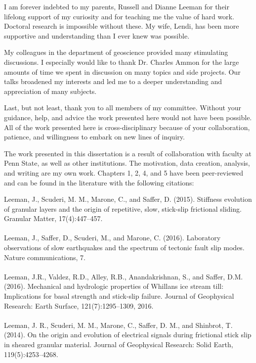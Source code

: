 \documentclass[11pt]{psuthesis}
\begin{document}
\begin{frontmatter}
\acknowledgments  

I am forever indebted to my parents, Russell and Dianne Leeman for their lifelong support of my curiosity and for teaching me the value of hard work. Doctoral research is impossible without these. My wife, Lendi, has been more supportive and understanding than I ever knew was possible. 

My colleagues in the department of geoscience provided many stimulating discussions. I especially would like to thank Dr. Charles Ammon for the large amounts of time we spent in discussion on many topics and side projects. Our talks broadened my interests and led me to a deeper understanding and appreciation of many subjects.

Last, but not least, thank you to all members of my committee. Without your guidance, help, and advice the work presented here would not have been possible. All of the work presented here is cross-disciplinary because of your collaboration, patience, and willingness to embark on new lines of inquiry.

\preface 
\begin{singlespace}
\noindent
The work presented in this dissertation is a result of collaboration with faculty at Penn State, as well as other institutions. The motivation, data creation, analysis, and writing are my own work. Chapters 1, 2, 4, and 5 have been peer-reviewed and can be found in the literature with the following citations: \\
\begin{adjustwidth}{2cm}{}
Leeman, J., Scuderi, M. M., Marone, C., and Saffer, D. (2015). Stiffness evolution of granular layers and the origin of repetitive, slow, stick-slip frictional sliding. Granular Matter, 17(4):447--457.\\\\
Leeman, J., Saffer, D., Scuderi, M., and Marone, C. (2016). Laboratory observations of slow earthquakes and the spectrum of tectonic fault slip modes. Nature communications, 7.\\\\
Leeman, J.R., Valdez, R.D., Alley, R.B., Anandakrishnan, S., and Saffer, D.M. (2016). Mechanical and hydrologic properties of Whillans ice stream till: Implications for basal strength and stick-slip failure. Journal of Geophysical Research: Earth Surface, 121(7):1295--1309, 2016.\\\\
Leeman, J. R., Scuderi, M. M., Marone, C., Saffer, D. M., and Shinbrot, T. (2014). On the origin and evolution of electrical signals during frictional stick slip in sheared granular material. Journal of Geophysical Research: Solid Earth, 119(5):4253--4268.\\
\end{adjustwidth}


\end{singlespace}
\end{frontmatter}
\end{document}

